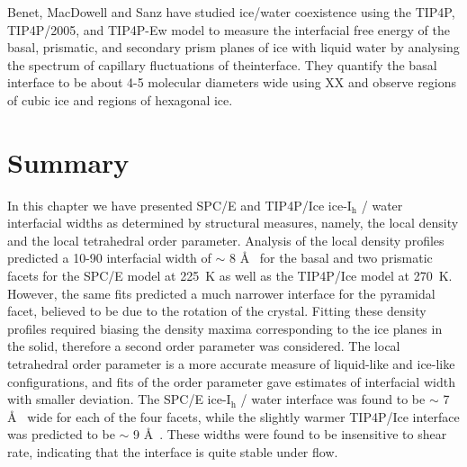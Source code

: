 Benet, MacDowell and Sanz have studied ice/water coexistence using the
TIP4P, TIP4P/2005, and TIP4P-Ew model to measure the interfacial free
energy of the basal, prismatic, and secondary prism planes of ice with
liquid water by analysing the spectrum of capillary fluctuations of
theinterface. They quantify the basal interface to be about 4-5
molecular diameters wide using XX and observe regions of cubic ice and
regions of hexagonal ice. \cite{Benet2014}


\section{Summary}
In this chapter we have presented SPC/E and TIP4P/Ice
ice-I$_\mathrm{h}$ / water interfacial widths as determined by
structural measures, namely, the local density and the local
tetrahedral order parameter. Analysis of the local density profiles
predicted a 10-90 interfacial width of $\sim$ 8 \AA~ for the basal and
two prismatic facets for the SPC/E model at 225~K as well as the
TIP4P/Ice model at 270~K. However, the same fits predicted a much
narrower interface for the pyramidal facet, believed to be due to the
rotation of the crystal. Fitting these density profiles required
biasing the density maxima corresponding to the ice planes in the
solid, therefore a second order parameter was considered. The local
tetrahedral order parameter is a more accurate measure of liquid-like
and ice-like configurations, and fits of the order parameter gave
estimates of interfacial width with smaller deviation. The SPC/E
ice-I$_\mathrm{h}$ / water interface was found to be $\sim$ 7 \AA~
wide for each of the four facets, while the slightly warmer TIP4P/Ice
interface was predicted to be $\sim$ 9 \AA~. These widths were found
to be insensitive to shear rate, indicating that the interface is
quite stable under flow.
